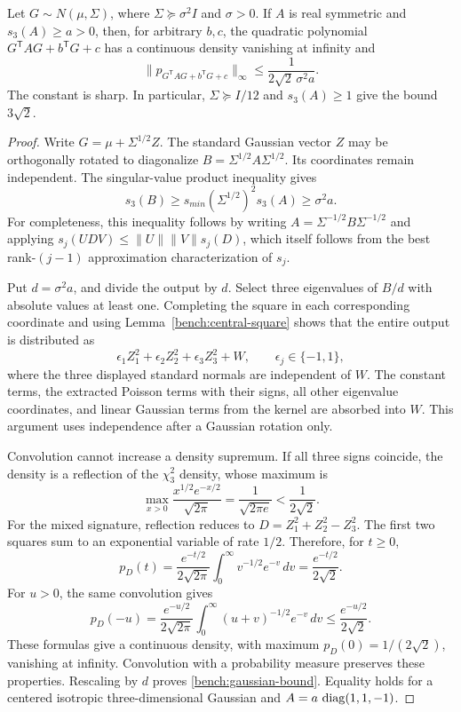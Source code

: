 \begin{theorem}\label{bench:gaussian}
Let \(G\sim N(\mu,\Sigma)\), where \(\Sigma\succeq\sigma^2I\) and
\(\sigma>0\).  If \(A\) is real symmetric and \(s_3(A)\geq a>0\),
then, for arbitrary \(b,c\), the quadratic polynomial
\(G^{\mathsf T}AG+b^{\mathsf T}G+c\) has a continuous density vanishing
at infinity and
\begin{equation}\label{bench:gaussian-bound}
 \|p_{G^{\mathsf T}AG+b^{\mathsf T}G+c}\|_\infty
 \leq\frac{1}{2\sqrt2\,\sigma^2a}.
\end{equation}
The constant is sharp.  In particular, \(\Sigma\succeq I/12\) and
\(s_3(A)\geq1\) give the bound \(3\sqrt2\).
\end{theorem}
\begin{proof}
Write \(G=\mu+\Sigma^{1/2}Z\).  The standard Gaussian vector \(Z\)
may be orthogonally rotated to diagonalize
\(B=\Sigma^{1/2}A\Sigma^{1/2}\).  Its coordinates remain independent.
The singular-value product inequality gives
\[
 s_3(B)\geq s_{min}(\Sigma^{1/2})^2s_3(A)
          \geq\sigma^2a.
\]
For completeness, this inequality follows by writing
\(A=\Sigma^{-1/2}B\Sigma^{-1/2}\) and applying
\(s_j(UDV)\leq\|U\|\|V\|s_j(D)\), which itself follows from the
best rank-\((j-1)\) approximation characterization of \(s_j\).

Put \(d=\sigma^2a\), and divide the output by \(d\).
Select three eigenvalues of \(B/d\) with absolute values at least
one.  Completing the square in each corresponding coordinate and
using Lemma~\ref{bench:central-square} shows that the entire output
is distributed as
\[
 \epsilon_1Z_1^2+\epsilon_2Z_2^2+\epsilon_3Z_3^2+W,
 \qquad \epsilon_j\in\{-1,1\},
\]
where the three displayed standard normals are independent of \(W\).
The constant terms, the extracted Poisson terms with their signs, all
other eigenvalue coordinates, and linear Gaussian terms from the kernel
are absorbed into \(W\).  This argument uses independence after a
Gaussian rotation only.

Convolution cannot increase a density supremum.  If all three signs
coincide, the density is a reflection of the \(\chi_3^2\) density,
whose maximum is
\[
 \max_{x>0}\frac{x^{1/2}e^{-x/2}}{\sqrt{2\pi}}
 =\frac1{\sqrt{2\pi e}}<\frac1{2\sqrt2}.
\]
For the mixed signature, reflection reduces to
\(D=Z_1^2+Z_2^2-Z_3^2\).  The first two squares sum to an exponential
variable of rate \(1/2\).  Therefore, for \(t\geq0\),
\[
 p_D(t)=\frac{e^{-t/2}}{2\sqrt{2\pi}}
                \int_0^\infty v^{-1/2}e^{-v}\,dv
        =\frac{e^{-t/2}}{2\sqrt2}.
\]
For \(u>0\), the same convolution gives
\[
 p_D(-u)=\frac{e^{-u/2}}{2\sqrt{2\pi}}
       \int_0^\infty(u+v)^{-1/2}e^{-v}\,dv
       \leq\frac{e^{-u/2}}{2\sqrt2}.
\]
These formulas give a continuous density, with maximum
\(p_D(0)=1/(2\sqrt2)\), vanishing at infinity.  Convolution with a
probability measure preserves these properties.  Rescaling by \(d\)
proves \eqref{bench:gaussian-bound}.  Equality holds for a centered
isotropic three-dimensional Gaussian and
\(A=a\,\operatorname{diag}(1,1,-1)\).
\end{proof}

